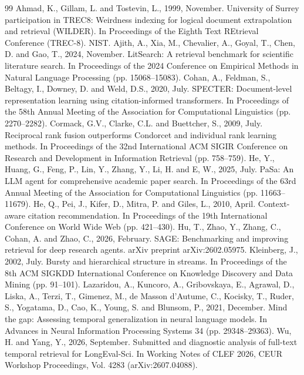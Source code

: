 \documentclass[10pt,twocolumn]{article}
\begin{document}
\begin{thebibliography}{99}\small\itemsep0pt
 Ahmad, K., Gillam, L. and Tostevin, L., 1999, November. University of Surrey participation in TREC8: Weirdness indexing for logical document extrapolation and retrieval (WILDER). In Proceedings of the Eighth Text REtrieval Conference (TREC-8). NIST.
 Ajith, A., Xia, M., Chevalier, A., Goyal, T., Chen, D. and Gao, T., 2024, November. LitSearch: A retrieval benchmark for scientific literature search. In Proceedings of the 2024 Conference on Empirical Methods in Natural Language Processing (pp. 15068--15083).
 Cohan, A., Feldman, S., Beltagy, I., Downey, D. and Weld, D.S., 2020, July. SPECTER: Document-level representation learning using citation-informed transformers. In Proceedings of the 58th Annual Meeting of the Association for Computational Linguistics (pp. 2270--2282).
 Cormack, G.V., Clarke, C.L. and Buettcher, S., 2009, July. Reciprocal rank fusion outperforms Condorcet and individual rank learning methods. In Proceedings of the 32nd International ACM SIGIR Conference on Research and Development in Information Retrieval (pp. 758--759).
 He, Y., Huang, G., Feng, P., Lin, Y., Zhang, Y., Li, H. and E, W., 2025, July. PaSa: An LLM agent for comprehensive academic paper search. In Proceedings of the 63rd Annual Meeting of the Association for Computational Linguistics (pp. 11663--11679).
 He, Q., Pei, J., Kifer, D., Mitra, P. and Giles, L., 2010, April. Context-aware citation recommendation. In Proceedings of the 19th International Conference on World Wide Web (pp. 421--430).
 Hu, T., Zhao, Y., Zhang, C., Cohan, A. and Zhao, C., 2026, February. SAGE: Benchmarking and improving retrieval for deep research agents. arXiv preprint arXiv:2602.05975.
 Kleinberg, J., 2002, July. Bursty and hierarchical structure in streams. In Proceedings of the 8th ACM SIGKDD International Conference on Knowledge Discovery and Data Mining (pp. 91--101).
 Lazaridou, A., Kuncoro, A., Gribovskaya, E., Agrawal, D., Liska, A., Terzi, T., Gimenez, M., de Masson d'Autume, C., Kocisky, T., Ruder, S., Yogatama, D., Cao, K., Young, S. and Blunsom, P., 2021, December. Mind the gap: Assessing temporal generalization in neural language models. In Advances in Neural Information Processing Systems 34 (pp. 29348--29363).
 Wu, H. and Yang, Y., 2026, September. Submitted and diagnostic analysis of full-text temporal retrieval for LongEval-Sci. In Working Notes of CLEF 2026, CEUR Workshop Proceedings, Vol. 4283 (arXiv:2607.04088).

\end{thebibliography}
\end{document}
